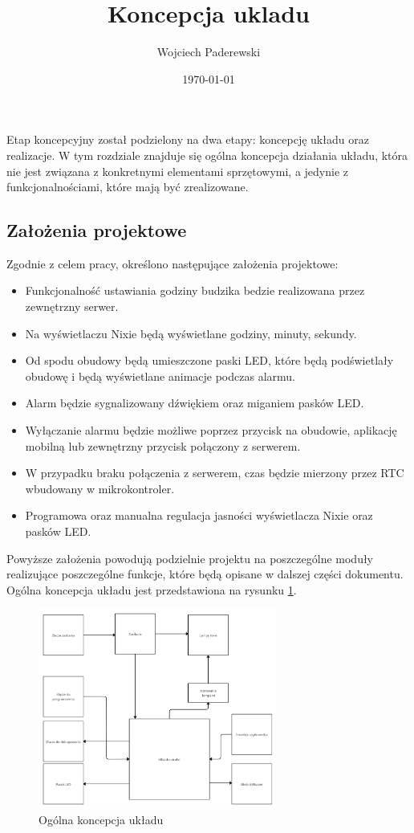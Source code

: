 \documentclass[../main.tex]{subfiles}
\author{Wojciech Paderewski}
\date{\today}
\title{Koncepcja ukladu}
\begin{document}
 Etap koncepcyjny został podzielony na dwa etapy: koncepcję układu oraz realizacje. W tym rozdziale znajduje się ogólna koncepcja 
 działania układu, która nie jest związana z konkretnymi elementami sprzętowymi, a jedynie z funkcjonalnościami, które mają być zrealizowane.
 \subsection{Założenia projektowe}
Zgodnie z celem pracy, określono następujące założenia projektowe:
\begin{itemize}
    \item Funkcjonalność ustawiania godziny budzika bedzie realizowana przez zewnętrzny serwer.
    \item Na wyświetlaczu Nixie będą wyświetlane godziny, minuty, sekundy.
    \item Od spodu obudowy będą umieszczone paski LED, które będą podświetlały obudowę i będą wyświetlane animacje podczas alarmu.
    \item Alarm będzie sygnalizowany dźwiękiem oraz miganiem pasków LED.
    \item Wyłączanie alarmu będzie możliwe poprzez przycisk na obudowie, aplikację mobilną lub zewnętrzny przycisk połączony z serwerem.
    \item W przypadku braku połączenia z serwerem, czas będzie mierzony przez RTC wbudowany w mikrokontroler.
    \item Programowa oraz manualna regulacja jasności wyświetlacza Nixie oraz pasków LED.
\end{itemize}
Powyższe założenia powodują podzielnie projektu na poszczególne moduły realizujące poszczególne funkcje, które będą opisane w dalszej części dokumentu.
Ogólna koncepcja układu jest przedstawiona na rysunku \ref{fig:concept}.
\begin{figure}[H]
    \centering
    \includegraphics[width=0.7\textwidth]{Nixie-concept.png}
    \caption{Ogólna koncepcja układu}
    \label{fig:concept}
\end{figure}
\end{document}
